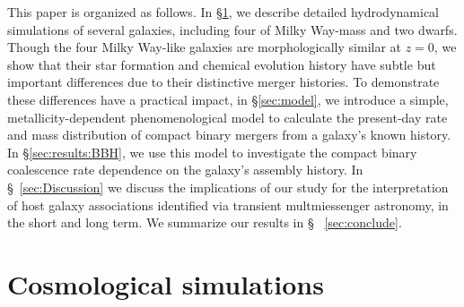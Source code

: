\documentclass[nofootinbib,twocolumn,prd]{emulateapj}
\newcommand\editremark[1]{{\color{red}#1}}
\begin{document}
This paper is organized as follows. 
In \S \ref{sec:sims}, we describe detailed hydrodynamical simulations of  several galaxies, including four of Milky Way-mass and two dwarfs.  Though the four Milky Way-like galaxies are morphologically similar at $z = 0$, we
show that their star formation and chemical evolution history have subtle but important differences due to their
distinctive merger histories.   To demonstrate
these differences have a practical impact,  in \S \ref{sec:model}, we introduce a simple,
metallicity-dependent  phenomenological model to calculate the present-day rate and mass distribution of compact binary
mergers from  a galaxy's known history.   In \S \ref{sec:results:BBH}, we use this model to investigate  the compact
binary  coalescence rate
dependence on the galaxy's assembly history.   
In \S~\ref{sec:Discussion} we discuss the implications of our study for the interpretation of host galaxy associations
identified via transient multmiessenger astronomy, in the short and long term.  We summarize our results in \S~ \ref{sec:conclude}.
%






\section{Cosmological simulations}%
\label{sec:sims}
\end{document}
